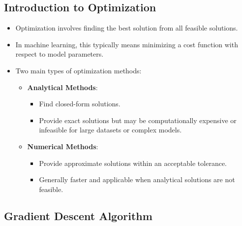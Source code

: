 \documentclass{article}
\begin{document}
\subsection{Introduction to Optimization}

\begin{itemize}
    \item Optimization involves finding the best solution from all feasible solutions.
    \item In machine learning, this typically means minimizing a cost function with respect to model parameters.
    \item Two main types of optimization methods:
    \begin{itemize}
        \item \textbf{Analytical Methods}:
        \begin{itemize}
            \item Find closed-form solutions.
            \item Provide exact solutions but may be computationally expensive or infeasible for large datasets or complex models.
        \end{itemize}
        \item \textbf{Numerical Methods}:
        \begin{itemize}
            \item Provide approximate solutions within an acceptable tolerance.
            \item Generally faster and applicable when analytical solutions are not feasible.
        \end{itemize}
    \end{itemize}
\end{itemize}

\subsection{Gradient Descent Algorithm}
\end{document}
